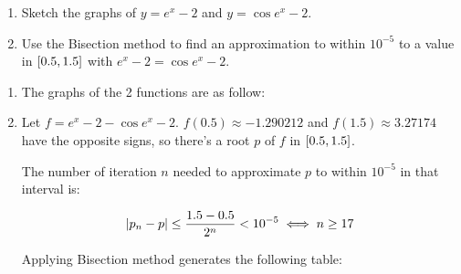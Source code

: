 \documentclass[../../Assignments.tex]{subfiles}
\begin{document}
\begin{exercise}
    \begin{enumerate}[label = (\alph*)]
        \item Sketch the graphs of \(y = e^x - 2\) and \(y = \cos{e^x - 2}\).
        \item Use the Bisection method to find an approximation to within
            \(10^{-5}\) to a value in \(\interval{\num{0.5}}{\num{1.5}}\) with
            \(e^x - 2 = \cos{e^x - 2}\).
    \end{enumerate}
\end{exercise}

\begin{solution}
    \begin{enumerate}[label = (\alph*)]
        \item The graphs of the 2 functions are as follow:

            \begin{center}
                
            \end{center}

        \item Let \(f = e^x - 2 - \cos{e^x - 2}\). \(f(\num{0.5}) \approx
            \num{-1.290212} \) and \(f(\num{1.5}) \approx \num{3.27174}\) have
            the opposite signs, so there's a root \(p\) of \(f\) in
            \(\interval{\num{0.5}}{\num{1.5}}\).

            The number of iteration \(n\) needed to approximate \(p\) to within
            \(10^{-5}\) in that interval is:

            \[\abs{p_n - p} \leq \frac{\num{1.5} - \num{0.5}}{2^n} < 10^{-5} \iff n \geq 17\]

            Applying Bisection method generates the following table:


\end{enumerate}
\end{solution}
\end{document}
